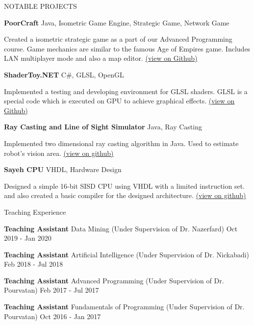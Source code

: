 \documentclass{resume} %
\begin{document}
\begin{rSection}{NOTABLE PROJECTS}
\item \textbf{PoorCraft} {Java, Isometric Game Engine, Strategic Game, Network Game}
\begin{addmargin}[2em]{2em}
Created a isometric strategic game as a part of our Advanced Programming course. Game mechanics are similar to the famous Age of Empires game. Includes LAN multiplayer mode and also a map editor. \href{https://github.com/arminkz/PoorCraft}{(view on Github)}
\end{addmargin}

\pagebreak

\item \textbf{ShaderToy.NET} {C\#, GLSL, OpenGL} 
\begin{addmargin}[2em]{2em}
Implemented a testing and developing environment for GLSL shaders. GLSL is a special code which is executed on GPU to achieve graphical effects. \href{https://github.com/arminkz/ShaderToy.NET}{(view on Github)}
\end{addmargin}


\item \textbf{Ray Casting and Line of Sight Simulator} {Java, Ray Casting}
\begin{addmargin}[2em]{2em}
Implemented two dimensional ray casting algorithm in Java. Used to estimate robot's vision area. \href{https://github.com/arminkz/RayCasting}{(view on github)}
\end{addmargin}


\item \textbf{Sayeh CPU} {VHDL, Hardware Design}
\begin{addmargin}[2em]{2em}
Designed a simple 16-bit SISD CPU using VHDL with a limited instruction set. and also created a basic compiler for the designed architecture. \href{https://github.com/arminkz/ShaderToy.NET}{(view on github)}
\end{addmargin}



\end{rSection} 


\begin{rSection}{Teaching Experience}
\vspace{-1.25em}
\item \textbf{Teaching Assistant} {Data Mining (Under Supervision of Dr. Nazerfard)} \hfill Oct 2019 - Jan 2020
\item \textbf{Teaching Assistant} {Artificial Intelligence (Under Supervision of Dr. Nickabadi)} \hfill Feb 2018 - Jul 2018
\item \textbf{Teaching Assistant} {Advanced Programming (Under Supervision of Dr. Pourvatan)} \hfill Feb 2017 - Jul 2017
\item \textbf{Teaching Assistant} {Fundamentals of Programming (Under Supervision of Dr. Pourvatan)} \hfill Oct 2016 - Jan 2017
\\
\end{rSection} 
\end{document}
